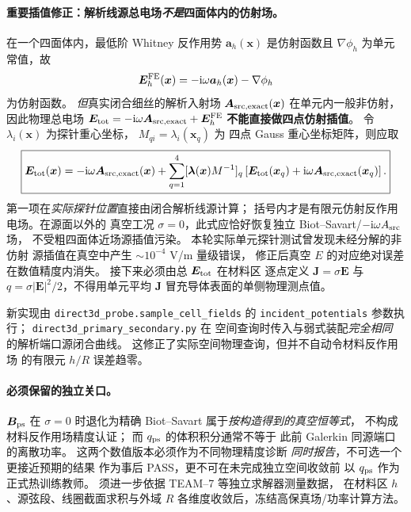 \paragraph{重要插值修正：解析线源总电场\emph{不是}四面体内的仿射场。}
在一个四面体内，最低阶 Whitney 反作用势
$\bm a_h(\bm x)$ 是仿射函数且
$\nabla\phi_h$ 为单元常值，故
\begin{equation}
 \bm E_h^{\rm FE}(\bm x)
   =-\mathrm i\omega\bm a_h(\bm x)-\nabla\phi_h
\end{equation}
为仿射函数。
\emph{但}真实闭合细丝的解析入射场
$\bm A_{\rm src,exact}(\bm x)$ 在单元内一般非仿射，
因此物理总电场
$\bm E_{\rm tot}=-\mathrm i\omega\bm A_{\rm src,exact}
+\bm E_h^{\rm FE}$ \textbf{不能直接做四点仿射插值}。
令 $\lambda_i(\bm x)$ 为探针重心坐标，
$M_{qi}=\lambda_i(\bm x_q)$ 为
四点 Gauss 重心坐标矩阵，则应取
\begin{equation}
\boxed{
 \bm E_{\rm tot}(\bm x)
 =-\mathrm i\omega\bm A_{\rm src,exact}(\bm x)
 +\sum_{q=1}^4[\bm\lambda(\bm x)M^{-1}]_q
 \left[
  \bm E_{\rm tot}(\bm x_q)
 +\mathrm i\omega\bm A_{\rm src,exact}(\bm x_q)
 \right].}
\end{equation}
第一项在\emph{实际探针位置}直接由闭合解析线源计算；
括号内才是有限元仿射反作用电场。在源面以外的
真空工况 $\sigma=0$，此式应恰好恢复独立
Biot--Savart/$-\mathrm i\omega A_{\rm src}$ 场，
不受粗四面体近场源插值污染。
本轮实际单元探针测试曾发现未经分解的非仿射
源插值在真空中产生 $\sim10^{-4}$ V/m 量级错误，
修正后真空 $E$ 的对应绝对误差在数值精度内消失。
接下来必须由总 $\bm E_{\rm tot}$ 在材料区
逐点定义 $\bm J=\sigma\bm E$ 与
$q=\sigma|\bm E|^2/2$，不得用单元平均 $\bm J$
冒充导体表面的单侧物理测点值。

新实现由
\texttt{direct3d\_probe.sample\_cell\_fields}
的 \texttt{incident\_potentials} 参数执行；
\texttt{direct3d\_primary\_secondary.py} 在
空间查询时传入与弱式装配\emph{完全相同}
的解析端口源闭合曲线。
这修正了实际空间物理查询，但并不自动令材料反作用场
的有限元 $h/R$ 误差趋零。

\paragraph{必须保留的独立关口。}
$\bm B_{\rm ps}$ 在 $\sigma=0$ 时退化为精确
Biot--Savart 属于\emph{按构造得到的真空恒等式}，
不构成材料反作用场精度认证；
而 $q_{\rm ps}$ 的体积积分通常不等于
此前 Galerkin 同源端口的离散功率。
这两个数值版本必须作为不同物理精度诊断
\emph{同时报告}，不可选一个更接近预期的结果
作为事后 PASS，更不可在未完成独立空间收敛前
以 $q_{\rm ps}$ 作为正式热训练教师。
须进一步依据 TEAM--7 等独立求解器测量数据，
在材料区 $h$、源弦段、线圈截面求积与外域 $R$
各维度收敛后，冻结高保真场/功率计算方法。


